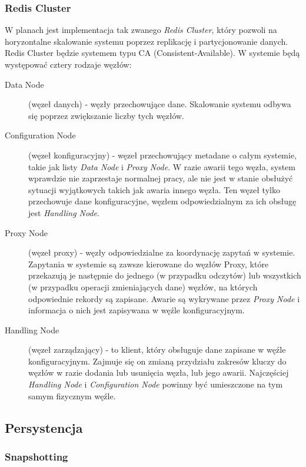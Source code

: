 \subsubsection*{Redis Cluster}
\label{sec:redis-cluster}

W planach jest implementacja tak zwanego \emph{Redis Cluster}, który pozwoli na horyzontalne skalowanie systemu poprzez replikację i partycjonowanie danych.
Redis Cluster będzie systemem typu CA (Consistent-Available).
W systemie będą występować cztery rodzaje węzłów:

\begin{description}
 \item[Data Node] (węzeł danych) - węzły przechowujące dane.
 Skalowanie systemu odbywa się poprzez zwiększanie liczby tych węzłów.

 \item[Configuration Node] (węzeł konfiguracyjny) - węzeł przechowujący metadane o całym systemie, takie jak listy \emph{Data Node} i \emph{Proxy Node}.
 W razie awarii tego węzła, system wprawdzie nie zaprzestaje normalnej pracy, ale nie jest w stanie obsłużyć sytuacji wyjątkowych takich jak awaria innego węzła.
 Ten węzeł tylko przechowuje dane konfiguracyjne, węzłem odpowiedzialnym za ich obsługę jest \emph{Handling Node}.

 \item[Proxy Node] (węzeł proxy) - węzły odpowiedzialne za koordynację zapytań w systemie.
 Zapytania w systemie są zawsze kierowane do węzłów Proxy, które przekazują je następnie do jednego (w przypadku odczytów) lub wszystkich (w przypadku operacji zmieniających dane) węzłów, na których odpowiednie rekordy są zapisane.
 Awarie są wykrywane przez \emph{Proxy Node} i informacja o nich jest zapisywana w węźle konfiguracyjnym.

 \item[Handling Node] (węzeł zarządzający) - to klient, który obsługuje dane zapisane w węźle konfiguracyjnym.
 Zajmuje się on zmianą przydziału zakresów kluczy do węzłów w razie dodania lub usunięcia węzła, lub jego awarii.
 Najczęściej \emph{Handling Node} i \emph{Configuration Node} powinny być umieszczone na tym samym fizycznym węźle.
\end{description}

\subsection*{Persystencja}

\subsubsection*{Snapshotting}

